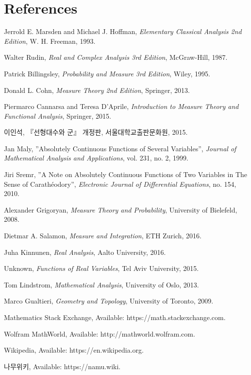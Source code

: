 \section*{References}
\normalsize\ttfamily
\begin{enumerate}[label = {[\arabic*]}]
    \item Jerrold E. Marsden and Michael J. Hoffman, \textit{Elementary Classical Analysis 2nd Edition}, W. H. Freeman, 1993.
    \item Walter Rudin, \textit{Real and Complex Analysis 3rd Edition}, McGraw-Hill, 1987.
    \item Patrick Billingsley, \textit{Probability and Measure 3rd Edition}, Wiley, 1995.
    \item Donald L. Cohn, \textit{Measure Theory 2nd Edition}, Springer, 2013.
    \item Piermarco Cannarsa and Teresa D'Aprile, \textit{Introduction to Measure Theory and Functional Analysis}, Springer, 2015.
    \item \textrm{이인석}, \textrm{『선형대수와 군』 개정판}, \textrm{서울대학교출판문화원}, 2015.
    \item Jan Maly, ''Absolutely Continuous Functions of Several Variables'', \textit{Journal of Mathematical Analysis and Applications}, vol. 231, no. 2, 1999.
    \item Jiri Sremr, ''A Note on Absolutely Continuous Functions of Two Variables in The Sense of Carath\'eodory'', \textit{Electronic Journal of Differential Equations}, no. 154, 2010.
    \item Alexander Grigoryan, \textit{Measure Theory and Probability}, University of Bielefeld, 2008.
    \item Dietmar A. Salamon, \textit{Measure and Integration}, ETH Zurich, 2016.
    \item Juha Kinnunen, \textit{Real Analysis}, Aalto University, 2016.
    \item Unknown, \textit{Functions of Real Variables}, Tel Aviv University, 2015.
    \item Tom Lindstrom, \textit{Mathematical Analysis}, University of Oslo, 2013.
    \item Marco Gualtieri, \textit{Geometry and Topology}, University of Toronto, 2009.
    \item Mathematics Stack Exchange, Available: https://math.stackexchange.com.
    \item Wolfram MathWorld, Available: http://mathworld.wolfram.com.
    \item Wikipedia, Available: https://en.wikipedia.org.
    \item \textrm{나무위키}, Available: https://namu.wiki.
\end{enumerate}
\rmfamily